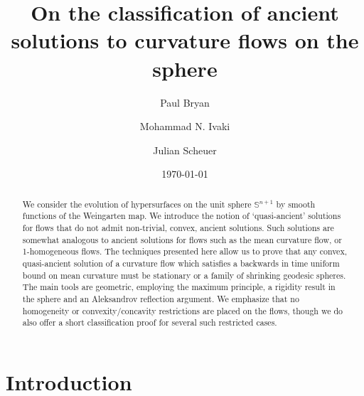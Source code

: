 \documentclass{amsart}
\begin{document}
\title[Ancient solutions to curvature flows in the sphere]
 {On the classification of ancient solutions to curvature flows on the sphere}

\author[P. Bryan]{Paul Bryan}
\address{Mathematics Institute, University of Warwick
Coventry, CV4 7AL, England}
\author[M.N. Ivaki]{Mohammad N. Ivaki}
\address{Institut f\"{u}r Diskrete Mathematik und Geometrie, Technische Universit\"{a}t Wien,
Wiedner Hauptstr. 8--10, 1040 Wien, Austria}
\author[J. Scheuer]{Julian Scheuer }
\address{Albert-Ludwigs-Universit\"{a}t,
Mathematisches Institut, Eckerstr. 1, 79104
Freiburg, Germany}
\date{\today}

\dedicatory{}
\subjclass[2010]{}

\begin{abstract}
We consider the evolution of hypersurfaces on the unit sphere $\mathbb{S}^{n+1}$ by smooth functions of the Weingarten map. We introduce the notion of `quasi-ancient' solutions for flows that do not admit non-trivial, convex, ancient solutions. Such solutions are somewhat analogous to ancient solutions for flows such as the mean curvature flow, or 1-homogeneous flows. The techniques presented here allow us to prove that any convex, quasi-ancient solution of a curvature flow which satisfies a backwards in time uniform bound on mean curvature must be stationary or a family of shrinking geodesic spheres. The main tools are geometric, employing the maximum principle, a rigidity result in the sphere and an Aleksandrov reflection argument. We emphasize that no homogeneity or convexity/concavity restrictions are placed on the flows, though we do also offer a short classification proof for several such restricted cases.
\end{abstract}

\maketitle

\section{Introduction}
\label{sec:intro}
\end{document}
